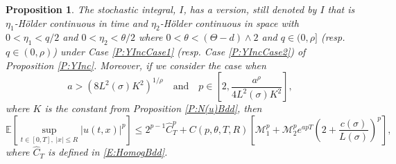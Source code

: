 \documentclass[12pt]{report}
\theoremstyle{plain}
\newtheorem{proposition}[theorem]{Proposition}
\theoremstyle{definition}
\numberwithin{equation}{section}
\begin{document}
\begin{proposition} \label{P:Holder}
	The stochastic integral, $I$, has a version, still denoted by $I$ that is $\eta_1$-H\"older continuous in time and $\eta_2$-H\"older continuous in space with $0 < \eta_1 < q/2$ and $0 < \eta_2 < \theta/2$ where $0 < \theta < (\Theta -d) \wedge 2$ and $q \in (0, \rho]$ (resp. $q \in (0, \rho)$) under Case \ref{P:YIncCase1} (resp. Case \ref{P:YIncCase2}) of Proposition \ref{P:YInc}. Moreover, if we consider the case when
	\[
	a > \left( 8 L^2(\sigma)K^2\right)^{1/\rho} \quad \text{and} \quad 	p \in \left[ 2, \frac{a^{\rho}}{4L^2(\sigma)K^2} \right],
	\]
	where $K$ is the constant from Proposition \ref{P:N(u)Bdd}, then  
	\[
	\mathbb{E}\left[ \sup_{t\in[0,T],\; |x| \le R} |u(t,x)|^p \right] \le 2^{p-1}\widehat{C}_T^p  + C(p, \theta, T,R) \left[ \mathcal{M}_1^p + \mathcal{M}_2^p e^{apT} \left(2 +  \frac{c(\sigma)}{L(\sigma)}\right)^p\right],
	\]
	where $\widehat{C}_T$ is defined in \eqref{E:HomogBdd}.
\end{proposition}
\end{document}
